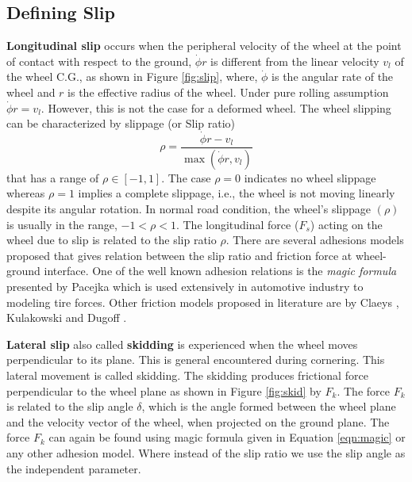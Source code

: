 {\subsection{Defining Slip}
\textbf{Longitudinal slip} occurs when the peripheral velocity of the wheel at the point of contact with respect to the ground, $\dot{\phi} r$ is different from the linear velocity $v_l$ of the wheel C.G., as shown in Figure \ref{fig:slip}, where, $\dot{\phi}$ is the angular rate of the wheel and $r$ is the effective radius of the wheel. Under pure rolling assumption  $\dot{\phi}  r=v_l$. However, this is not the case for a deformed wheel. The wheel slipping can be characterized by
slippage (or Slip ratio) \[\rho = \frac{\dot{\phi}  r - v_l}{\max(\dot{\phi}  r,v_l)}\] that has a  range of $ \rho \in [-1, 1]$. The case $\rho = 0$ indicates no wheel slippage whereas $\rho = 1$ implies a complete slippage, i.e., the wheel is not moving linearly despite its angular rotation. In normal road condition, the wheel's slippage $(\rho)$is usually in the range, $-1<\rho<1 $.
 The  longitudinal force ($F_s$) acting on the wheel due to slip is related to the slip ratio $\rho$. There are several adhesions models proposed that gives relation between the slip ratio and friction force at wheel-ground interface. One of the well known adhesion relations is the \textit{ magic formula} presented by Pacejka \cite{pacejka1992magic} which is used extensively in automotive industry to modeling tire forces. Other  friction models proposed in  literature  are by Claeys \cite{claeys2001dynamic}, Kulakowski \cite{kulakowski1991mathematical}  and Dugoff \cite{dugoff1970analysis}. 
 
 \textbf{Lateral slip }also called \textbf{skidding} is experienced when the wheel moves perpendicular to its plane. This is general encountered during cornering. This lateral movement is called skidding. The skidding produces frictional force perpendicular to the wheel plane as shown in Figure \ref{fig:skid} by $F_k$. The force $F_k$ is related to the slip angle $\delta$, which is the angle formed between the wheel plane and the velocity vector of the wheel, when projected on the ground plane.
 The force $F_k$ can again be found using magic formula \cite{pacejka1992magic} given in Equation \ref{eqn:magic} or any other adhesion model. Where instead of the slip ratio we use the slip angle as the independent parameter.
 
 
}
